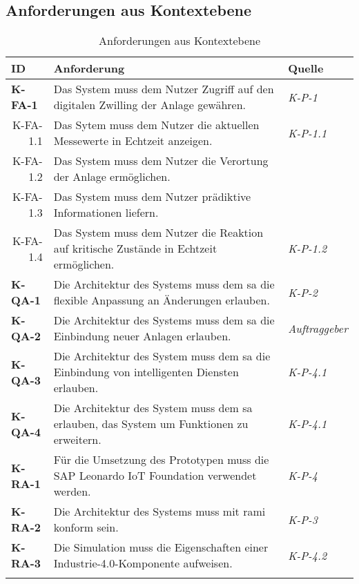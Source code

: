 \subsection{Anforderungen aus Kontextebene} \label{anfkontext}
\begin{table}[ht!]
  \begin{tabularx}{\textwidth}{@{}lXp{2cm}@{}}
      \toprule
      ID                & Anforderung & Quelle \\
      \midrule
      \textbf{K-FA-1}              &   Das System muss dem Nutzer Zugriff auf den digitalen Zwilling der Anlage gewähren.  & \textit{K-P-1}                \\
      \multicolumn{1}{r}{K-FA-1.1} &  Das Sytem muss dem Nutzer die aktuellen Messewerte in Echtzeit anzeigen.    & \textit{K-P-1.1}\\
      \multicolumn{1}{r}{K-FA-1.2} & Das System muss dem Nutzer die Verortung der Anlage ermöglichen. \\
      \multicolumn{1}{r}{K-FA-1.3} & Das System muss dem Nutzer prädiktive Informationen liefern.\\
      \multicolumn{1}{r}{K-FA-1.4} & Das System muss dem Nutzer die Reaktion auf kritische Zustände in Echtzeit ermöglichen.  & \textit{K-P-1.2}\\
      \textbf{K-QA-1}              & Die Architektur des Systems muss dem \ac{sa} die flexible Anpassung an Änderungen erlauben.     & \textit{K-P-2}                \\
      \textbf{K-QA-2}              & Die Architektur des Systems muss dem \ac{sa} die Einbindung neuer Anlagen erlauben.           & \textit{Auftraggeber}                \\
      \textbf{K-QA-3}              &  Die Architektur des System muss dem \ac{sa} die Einbindung von intelligenten Diensten erlauben.  & \textit{K-P-4.1} \\
      \textbf{K-QA-4}              &  Die Architektur des System muss dem \ac{sa} erlauben, das System um Funktionen zu erweitern.  & \textit{K-P-4.1} \\
      \textbf{K-RA-1}              & Für die Umsetzung des Prototypen muss die SAP Leonardo IoT Foundation verwendet werden.       & \textit{K-P-4} \\
      \textbf{K-RA-2}              & Die Architektur des Systems muss mit \ac{rami} konform sein.      & \textit{K-P-3} \\
      \textbf{K-RA-3}              & Die Simulation muss die Eigenschaften einer Industrie-4.0-Komponente aufweisen.      & \textit{K-P-4.2} \\
      \addlinespace
      \bottomrule
  \end{tabularx}
  \caption{Anforderungen aus Kontextebene}
  \label{kontext_anforderungen}
\end{table}

